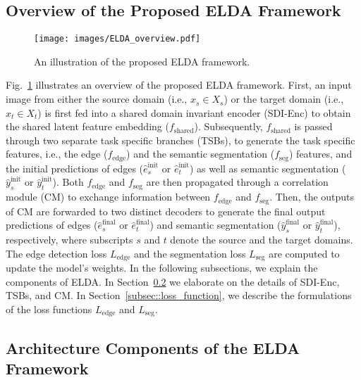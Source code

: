 \documentclass{bmvc2k}
\newcommand{\Xs}{X_s}
\newcommand{\Xt}{X_t}
\newcommand{\xs}{x_s}
\newcommand{\xt}{x_t}
\newcommand{\eshatinit}{\hat{e}_s^{\text{init}}}
\newcommand{\ethatinit}{\hat{e}_t^{\text{init}}}
\newcommand{\yshatinit}{\hat{y}_s^{\text{init}}}
\newcommand{\ythatinit}{\hat{y}_t^{\text{init}}}
\newcommand{\eshatfinal}{\hat{e}_s^{\text{final}}}
\newcommand{\ethatfinal}{\hat{e}_t^{\text{final}}}
\newcommand{\yshatfinal}{\hat{y}_s^{\text{final}}}
\newcommand{\ythatfinal}{\hat{y}_t^{\text{final}}}
\newcommand{\fs}{f_{\text{shared}}}
\newcommand{\fy}{f_{\text{seg}}}
\newcommand{\fe}{f_{\text{edge}}}
\newcommand{\Lseg}{L_{\text{seg}}}
\newcommand{\Ledge}{L_{\text{edge}}}
\begin{document}
\subsection{Overview of the Proposed ELDA Framework}
\label{subsec::ELDA_framework_overview}

\begin{figure}[t]
  \centering
  \texttt{[image: images/ELDA\_overview.pdf]}
\caption{An illustration of the proposed ELDA framework. 
}
\label{fig:ELDA_framework_overview}
\end{figure}


Fig.~\ref{fig:ELDA_framework_overview} illustrates an overview of the proposed ELDA framework. First, an input image from either the source domain (i.e., $\xs\in\Xs$) or the target domain (i.e., $\xt\in\Xt$) is first fed into a shared domain invariant encoder (SDI-Enc) to obtain the shared latent feature embedding ($\fs$). Subsequently, $\fs$ is passed through two separate task specific branches (TSBs), to generate the task specific features, i.e., the edge ($\fe$) and the semantic segmentation ($\fy$) features, and the initial predictions of edges ($\eshatinit$ or $\ethatinit$) as well as semantic segmentation ($\yshatinit$ or $\ythatinit$).
Both $\fe$ and $\fy$ are then propagated through a correlation module (CM) to exchange information between $\fe$ and $\fy$. Then, the outputs of CM are forwarded to two distinct decoders to generate the final output predictions of edges ($\eshatfinal$ or $\ethatfinal$) and semantic segmentation ($\yshatfinal$ or $\ythatfinal$), respectively, where subscripts $s$ and $t$ denote the source and the target domains. The edge detection loss $\Ledge$ and the segmentation loss $\Lseg$ are computed to update the model's weights. In the following subsections, we explain the components of ELDA. In Section~\ref{subsec::ELDA_architecture} we elaborate on the details of SDI-Enc, TSBs, and CM. 
In Section~\ref{subsec::loss_function}, we describe the formulations of the loss functions $\Ledge$ and $\Lseg$.









\subsection{Architecture Components of the ELDA Framework}
\label{subsec::ELDA_architecture}
\end{document}
